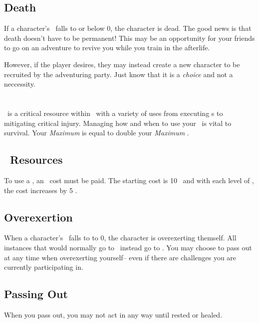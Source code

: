 \subsection{Death}\label{subsec:death}
If a character's \HPful\ falls to or below 0, the character is dead. The good news is that death doesn't have to be permanent!
This may be an opportunity for your friends to go on an adventure to revive you while you train in the afterlife.

However, if the player desires, they may instead create a new character
to be recruited by the adventuring party. Just know that it is a \emph{choice}
and not a neccessity.

\section{\ENful\index{\ENful}}\label{sec:energy}
\ENful\ is a critical resource within \gametitlemini\ with a variety of uses from executing \techn s to mitigating critical injury.
Managing how and when to use your \ENful\ is vital to survival. Your \emph{Maximum \ENful} is equal to double your \emph{Maximum \HPful}.

\subsection{\techn\ Resources}\index{\techn}\label{subsec:tech_resources}
To use a \techn{}, an \ENful\ cost must be paid. The starting cost is 10 \EN\ and with each level of \advancement{}\index{\advancement}, the cost increases by 5 \EN.

\subsection{Overexertion}\label{subsec:exhaustion}
When a character's \ENful\ falls to to 0, the character is overexerting themself. All instances that would normally go to \ENful\ instead go to \HPful . You may choose to pass out at any time when overexerting yourself-- even if there are challenges you are currently participating in.

\subsection{Passing Out}\label{subsec:pass_out}
When you pass out, you may not act in any way until rested or healed.

